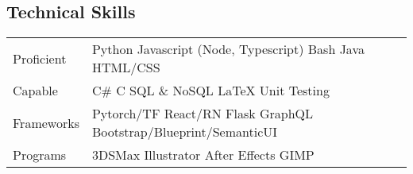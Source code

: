 \subsection*{Technical Skills}
\begin{indentsection}{\parindent}
\begin{tabular}{ m{2.2cm} | l }
 Proficient &
    \quad Python \quad Javascript (Node, Typescript) \quad Bash \quad Java \quad HTML/CSS\\
 Capable &
 	\quad C\# \quad C \quad SQL \& NoSQL \quad LaTeX \quad Unit Testing \\
 Frameworks&
 	\quad Pytorch/TF \quad React/RN \quad Flask \quad GraphQL \quad Bootstrap/Blueprint/SemanticUI \\
 Programs &
 	\quad 3DSMax \quad Illustrator \quad After Effects \quad GIMP
\end{tabular}
\end{indentsection}